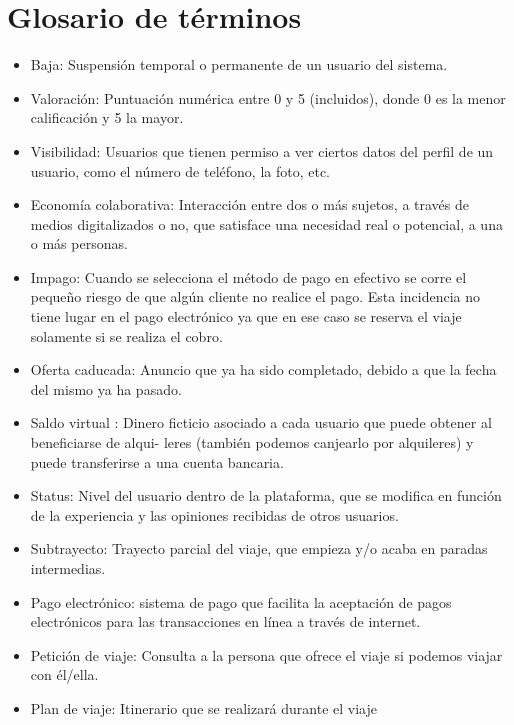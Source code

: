 \documentclass[11pt,spanish]{article} %
\begin{document}
\section{Glosario de términos}
\begin{itemize}
	\item Baja: Suspensión temporal o permanente de un usuario del sistema.
	\item Valoración: Puntuación numérica entre 0 y 5 (incluidos), donde 0 es la menor calificación y 5
la mayor.
	\item Visibilidad: Usuarios que tienen permiso a ver ciertos datos del perfil de un usuario, como el número de teléfono, la foto, etc.
	\item Economía colaborativa: Interacción entre dos o más sujetos, a través de medios digitalizados o
no, que satisface una necesidad real o potencial, a una o más personas.
	\item Impago: Cuando se selecciona el método de pago en efectivo se corre el pequeño riesgo de que algún cliente no realice el pago. Esta incidencia no tiene lugar en el pago electrónico ya que en ese caso se reserva el viaje solamente si se realiza el cobro.
	\item Oferta caducada: Anuncio que ya ha sido completado, debido a que la fecha del mismo ya ha pasado.
	\item Saldo virtual : Dinero ficticio asociado a cada usuario que puede obtener al beneficiarse de alqui-
leres (también podemos canjearlo por alquileres) y puede transferirse a una cuenta bancaria.
	\item Status: Nivel del usuario dentro de la plataforma, que se modifica en función de la experiencia
y las opiniones recibidas de otros usuarios.
	\item Subtrayecto: Trayecto parcial del viaje, que empieza y/o acaba en paradas intermedias.
	\item Pago electrónico: sistema de pago que facilita la aceptación de pagos electrónicos para las transacciones en línea a través de internet.
	\item Petición de viaje: Consulta a la persona que ofrece el viaje si podemos viajar con él/ella.
	\item Plan de viaje: Itinerario que se realizará durante el viaje
\end{itemize}


\end{document}
